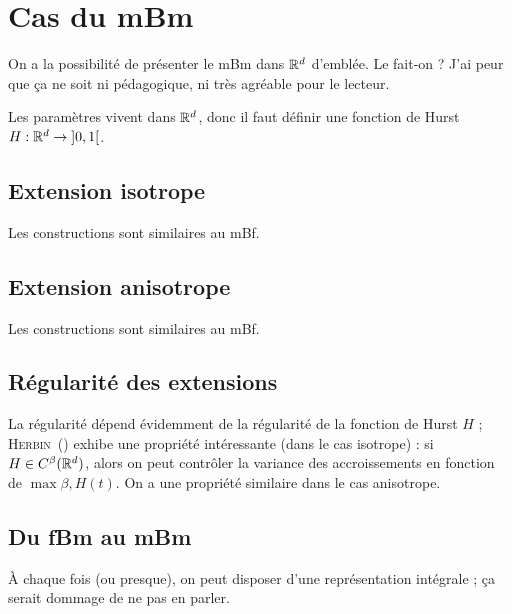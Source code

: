 \section{Cas du mBm}
\begin{question}
  On a la possibilité de présenter le mBm dans $\mathbb{R}^d$ d'emblée. Le
  fait-on ? J'ai peur que ça ne soit ni pédagogique, ni très agréable
  pour le lecteur.
\end{question}

Les paramètres vivent dans $\mathbb{R}^d$, donc il faut définir une fonction
de Hurst $H:\mathbb{R}^d \to \left]0,1\right[$.
\subsection{Extension isotrope}
Les constructions sont similaires au mBf.
\subsection{Extension anisotrope}
Les constructions sont similaires au mBf.
\subsection{Régularité des extensions}
La régularité dépend évidemment de la régularité de la fonction de
Hurst $H$ ; \textsc{Herbin}~(\cite{herbin2002}) exhibe une propriété
intéressante (dans le cas isotrope) : si $H \in C^\beta(\mathbb{R}^d)$, alors
on peut contrôler la variance des accroissements en fonction de
$\max{\beta, H(t)}$. On a une propriété similaire dans le cas
anisotrope.

\subsection{Du fBm au mBm}
\vspace{0.2em}
\begin{alert}
  À chaque fois (ou presque), on peut disposer d'une représentation
  intégrale ; ça serait dommage de ne pas en parler.
\end{alert}